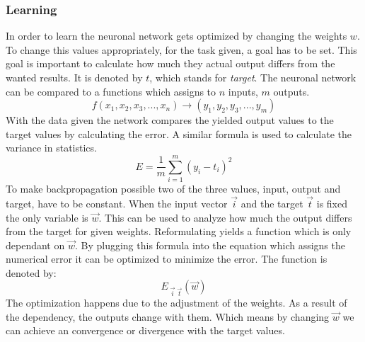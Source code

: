 \documentclass[12pt]{article}
\begin{document}
\subsubsection{Learning}\label{learning}
In order to learn the neuronal network gets optimized by changing the weights $w$. To change this values appropriately, for the task given, a goal has to be set. This goal is important to calculate how much they actual output differs from the wanted results. It is denoted by $t$, which stands for \textit{target}. The neuronal network can be compared to a functions which assigns to $n$ inputs, $m$ outputs.
\begin{equation}
    f(x_{1},x_{2},x_{3},...,x_{n}) \rightarrow (y_{1},y_{2},y_{3},...,y_{m})
\end{equation}
With the data given the network compares the yielded output values to the target values by calculating the error. A similar formula is used to calculate the variance in statistics.
\begin{equation}
   E = \frac{1}{m}\sum_{i=1}^{m}\left ( y_{i}- t_{i} \right )^{2}
\end{equation}
To make backpropagation possible two of the three values, input, output and target, have to be constant. When the input vector $\vec{i}$ and the target $\vec{t}$ is fixed the only variable is $\vec{w}$. This can be used to analyze how much the output differs from the target for given weights. Reformulating yields a function which is only dependant on $\vec{w}$. By plugging this formula into the equation which assigns the numerical error it can be optimized to minimize the error. The function is denoted by:
\begin{equation}
E_{\;\vec{i}\;\vec{t}}(\vec{w})
\end{equation}
The optimization happens due to the adjustment of the weights. As a result of the dependency, the outputs change with them. Which means by changing $\vec{w}$ we can achieve an convergence or divergence with the target values.
\end{document}
